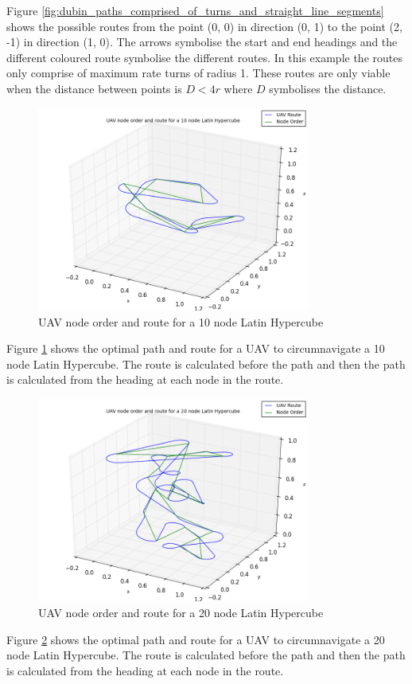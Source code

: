 \documentclass[a4paper,12pt,twoside]{article}
\begin{document}
Figure \ref{fig:dubin_paths_comprised_of_turns_and_straight_line_segments} shows the possible routes from the point (0, 0) in direction (0, 1) to the point (2, -1) in direction (1, 0). The arrows symbolise the start and end headings and the different coloured route symbolise the different routes. In this example the routes only comprise of maximum rate turns of radius 1. These routes are only viable when the distance between points is $D<4r$ where $D$ symbolises the distance.

\begin{figure}[H]
\centering
\includegraphics[width=0.8\textwidth]{figures/uav_node_order_and_route_for_a_10_node_latin_hypercube.png} 
\caption{UAV node order and route for a 10 node Latin Hypercube}
\label{fig:uav_node_order_and_route_for_a_10_node_latin_hypercube}
\end{figure}

Figure \ref{fig:uav_node_order_and_route_for_a_10_node_latin_hypercube} shows the optimal path and route for a UAV to circumnavigate a 10 node Latin Hypercube. The route is calculated before the path and then the path is calculated from the heading at each node in the route.

\begin{figure}[H]
\centering
\includegraphics[width=0.8\textwidth]{figures/uav_node_order_and_route_for_a_20_node_latin_hypercube.png} 
\caption{UAV node order and route for a 20 node Latin Hypercube}
\label{fig:uav_node_order_and_route_for_a_20_node_latin_hypercube}
\end{figure}

Figure \ref{fig:uav_node_order_and_route_for_a_20_node_latin_hypercube} shows the optimal path and route for a UAV to circumnavigate a 20 node Latin Hypercube. The route is calculated before the path and then the path is calculated from the heading at each node in the route.
\end{document}
